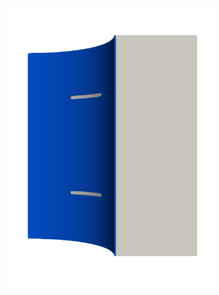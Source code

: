 \begin{frame}
\begin{columns}[T]
\begin{column}{0.6\textwidth}
\begin{figure}
{\begin{subfigure}{0.19\textwidth}
            \includegraphics[width=\textwidth]{Chapter345/figures/seed_ep_1}
          \end{subfigure}
        }
        

\end{figure}
\end{column}
\end{columns}
\end{frame}
